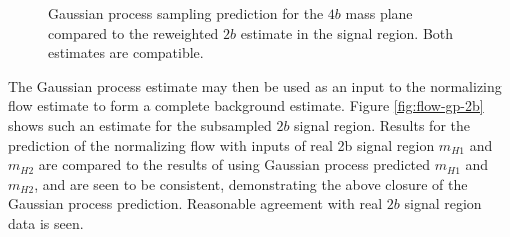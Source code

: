 \begin{figure}[ht]
	\centering

	\caption{\label{fig:gp-massplane-4b-18} Gaussian process sampling prediction for the $4b$ mass plane compared to 
	the reweighted $2b$ estimate in the signal region. Both estimates are compatible.}
\end{figure}

The Gaussian process estimate may then be used as an input to the normalizing flow estimate to form a 
complete background estimate. Figure \ref{fig:flow-gp-2b} shows such an estimate for the subsampled $2b$ 
signal region. Results for the prediction of the normalizing flow with 
inputs of real 2b signal region $m_{H1}$ and $m_{H2}$ are compared to the results of using Gaussian 
process predicted $m_{H1}$ and $m_{H2}$, and are seen to be consistent, demonstrating the above 
closure of the Gaussian process prediction. Reasonable agreement with real $2b$ signal region 
data is seen.

